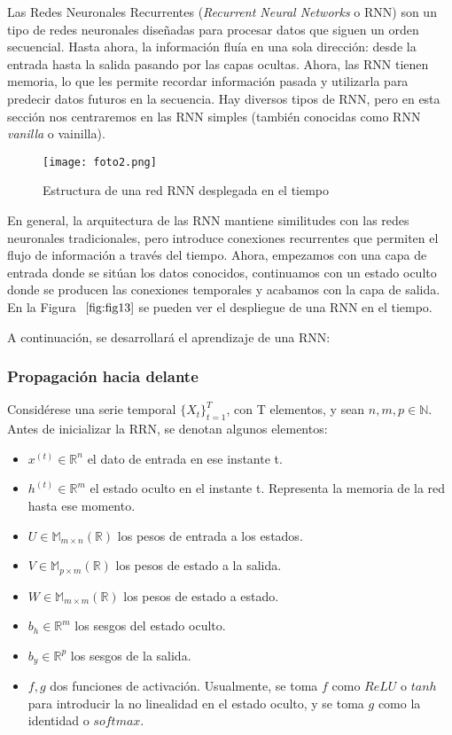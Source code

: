 \documentclass[12pt,twoside]{article}
\begin{document}
 Las Redes Neuronales Recurrentes (\textit{Recurrent Neural Networks} o RNN) \cite{rnn1} son un tipo de redes neuronales diseñadas para procesar datos que siguen un orden secuencial. Hasta ahora, la información fluía en una sola dirección: desde la entrada hasta la salida pasando por las capas ocultas. Ahora, las RNN tienen memoria, lo que les permite recordar información pasada y utilizarla para predecir datos futuros en la secuencia. Hay diversos tipos de RNN, pero en esta sección nos centraremos en las RNN simples (también conocidas como RNN \textit{vanilla} o vainilla).


\begin{figure}[h]
    \centering
    \texttt{[image: foto2.png]}
    \caption{Estructura de una red RNN desplegada en el tiempo} 
    \label{fig:fig13}
\end{figure}

En general, la arquitectura de las RNN mantiene similitudes con las redes neuronales tradicionales, pero introduce conexiones recurrentes que permiten el flujo de información a través del tiempo. Ahora, empezamos con una capa de entrada donde se sitúan los datos conocidos, continuamos con un estado oculto donde se producen las conexiones temporales y acabamos con la capa de salida. En la Figura $~\ref{fig:fig13}$ se pueden ver el despliegue de una RNN en el tiempo. 

A continuación, se desarrollará el aprendizaje \cite{rnn2} de una RNN:

\subsubsection{Propagación hacia delante}\label{sec:15}


Considérese una serie temporal $\{X_t\}_{t=1}^{T}$, con T elementos, y sean $n,m,p \in \mathbb{N}$. Antes de inicializar la RRN, se denotan algunos elementos: 

\begin{itemize}
    \item $x^{(t)} \in \mathbb{R}^n$ el dato de entrada en ese instante t.
    \item $h^{(t)} \in \mathbb{R}^m$ el estado oculto en el instante t. Representa la memoria de la red hasta ese momento.
    \item $U \in \mathbb{M}_{m \times n}(\mathbb{R})$ los pesos de entrada a los estados.
    \item $V \in \mathbb{M}_{p \times m}(\mathbb{R})$ los pesos de estado a la salida.
    \item $W \in \mathbb{M}_{m \times m}(\mathbb{R})$ los pesos de estado a estado.
    \item $b_h \in \mathbb{R}^m$ los sesgos del estado oculto.
    \item $b_y \in \mathbb{R}^p$ los sesgos de la salida.
    \item $f,g$ dos funciones de activación. Usualmente, se toma $f$ como $ReLU$ o $tanh$ para introducir la no linealidad en el estado oculto, y se toma $g$ como la identidad o $softmax$.
\end{itemize}
\end{document}
